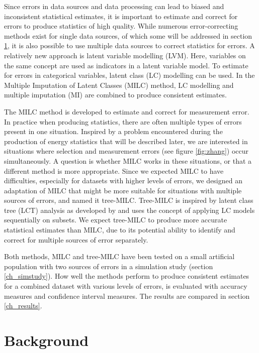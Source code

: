\documentclass[a4paper, 11pt]{article} %
\begin{document}
Since errors in data sources and data processing can lead to biased and inconsistent statistical estimates, it is important to estimate and correct for errors to produce statistics of high quality. While numerous error-correcting methods exist for single data sources, of which some will be addressed in section \ref{background}, it is also possible to use multiple data sources to correct statistics for errors. A relatively new approach is latent variable modelling (LVM). Here, variables on the same concept are used as indicators in a latent variable model. To estimate for errors in categorical variables, latent class (LC) modelling can be used. In the Multiple Imputation of Latent Classes (MILC) method, LC modelling and multiple imputation (MI) are combined to produce consistent estimates.

The MILC method is developed to estimate and correct for measurement error. In practice when producing statistics, there are often multiple types of errors present in one situation. Inspired by a problem encountered during the production of energy statistics that will be described later, we are interested in situations where selection and measurement errors (see figure \ref{fig:zhang}) occur simultaneously. A question is whether MILC works in these situations, or that a different method is more appropriate. Since we expected MILC to have difficulties, especially for datasets with higher levels of errors, we designed an adaptation of MILC that might be more suitable for situations with multiple sources of errors, and named it tree-MILC. Tree-MILC is inspired by latent class tree (LCT) analysis as developed by  and uses the concept of applying LC models sequentially on subsets. We expect tree-MILC to produce more accurate statistical estimates than MILC, due to its potential ability to identify and correct for multiple sources of error separately.

Both methods, MILC and tree-MILC have been tested on a small artificial population with two sources of errors in a simulation study (section \ref{ch_simstudy}). How well the methods perform to produce consistent estimates for a combined dataset with various levels of errors, is evaluated with accuracy measures and confidence interval measures. The results are compared in section \ref{ch_results}.

\section{Background}\label{background}
\end{document}
